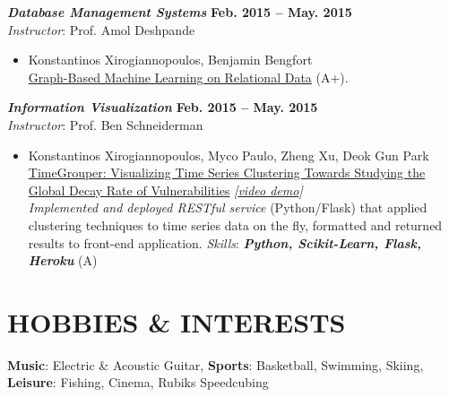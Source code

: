 \documentclass[margin, 10pt]{res} %
\begin{document}
\begin{resume}
{\sl \textbf{Database Management Systems}} \hfill \textbf{Feb. 2015 -- May. 2015}\\
\textit{Instructor}: Prof. Amol Deshpande
\begin{itemize}
  \item Konstantinos Xirogiannopoulos, Benjamin Bengfort\\
  \href{https://drive.google.com/open?id=0B20MIwp_I7FlUGhyVmFYcjFuYmM}{Graph-Based Machine Learning on Relational Data} (A+).
\end{itemize}

{\sl \textbf{Information Visualization}} \hfill \textbf{Feb. 2015 -- May. 2015}\\
\textit{Instructor}: Prof. Ben Schneiderman
\begin{itemize}
  \item Konstantinos Xirogiannopoulos, Myco Paulo, Zheng Xu, Deok Gun Park\\
  \href{https://wiki.cs.umd.edu/cmsc734_s15/images/f/fc/TimeGrouper_FinalReport.pdf}{TimeGrouper: Visualizing Time Series Clustering Towards Studying the Global Decay Rate of Vulnerabilities}  \textit{[\href{https://www.youtube.com/watch?v=oDgl6pp1CVU}{video demo}]}\\
  \textit{Implemented and deployed RESTful service} (Python/Flask) that applied clustering techniques to time series data on the fly, formatted and returned results to front-end application.  \textit{Skills}: \textbf{\textit{Python, Scikit-Learn, Flask, Heroku}} (A)
\end{itemize}



\section{HOBBIES \& INTERESTS}

\textbf{Music}: Electric \& Acoustic Guitar, \textbf{Sports}: Basketball, Swimming, Skiing, \textbf{Leisure}: Fishing, Cinema, Rubiks Speedcubing


\end{resume}
\end{document}
